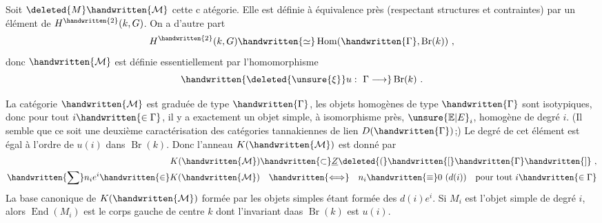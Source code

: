 Soit $\deleted{M}\handwritten{\mathcal{M}}$ cette c atégorie. Elle est définie à équivalence près (respectant structures et contraintes) par un élément de $H^{\handwritten{2}}(k,G)$. On a d'autre part
\[
H^{\handwritten{2}}(k,G)\handwritten{\simeq}\operatorname{Hom}(\handwritten{\Gamma},\operatorname{Br}(k))\ ,
\]
donc $\handwritten{\mathcal{M}}$ est définie essentiellement par l'homomorphisme 
\[
\handwritten{\deleted{\unsure{\xi}}u:\ \Gamma\longrightarrow}\operatorname{Br}(k)\ .
\]

 La catégorie $\handwritten{\mathcal{M}}$ est graduée de type $\handwritten{\Gamma}$, les objets homogènes de type $\handwritten{\Gamma}$ sont isotypiques, donc pour tout $i\handwritten{\in\Gamma}$, il y a exactement un objet simple, à isomorphisme près, $\unsure{\mathbb{E}|E}_i$,  homogène de degré $i$. (Il semble que ce soit une deuxième caractérisation des catégories tannakiennes de lien $D(\handwritten{\Gamma})$;) Le degré de cet élément est égal à l'ordre de $u(i)$ dans $\operatorname{Br}(k)$. Donc l'anneau $K(\handwritten{\mathcal{M}})$ est donné par
\[
\begin{aligned}
K(\handwritten{\mathcal{M}})\handwritten{\subset}\underline{Z}\deleted{(}\handwritten{[}\handwritten{\Gamma}\handwritten{]}\ ,\\
\handwritten{\sum}n_i e^i\handwritten{\in}K(\handwritten{\mathcal{M}})\quad\handwritten{\Longleftrightarrow}\quad n_i\handwritten{\equiv}0\ (d(i))\quad\text{pour tout }i\handwritten{\in\Gamma}
\end{aligned}
\]
La base canonique de $K(\handwritten{\mathcal{M}})$ formée par les objets simples étant formée des $d(i)e^i$. Si $M_i$ est l'objet simple de  degré $i$, alors $\operatorname{End}(M_i)$ est le corps gauche  de centre $k$ dont l'invariant daas $\operatorname{Br}(k)$ est $u(i)$.

